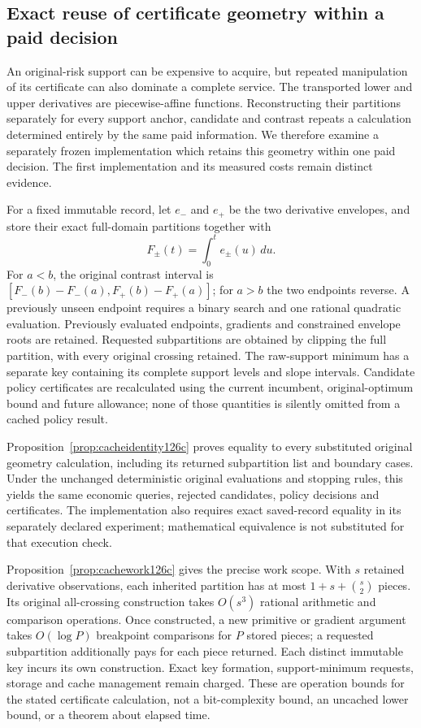 \subsection{Exact reuse of certificate geometry within a paid decision}
\label{sec:cachedgeometry126c}

An original-risk support can be expensive to acquire, but repeated manipulation
of its certificate can also dominate a complete service.  The transported
lower and upper derivatives are piecewise-affine functions.  Reconstructing
their partitions separately for every support anchor, candidate and contrast
repeats a calculation determined entirely by the same paid information.  We
therefore examine a separately frozen implementation which retains this
geometry within one paid decision.  The first implementation and its measured
costs remain distinct evidence.

For a fixed immutable record, let $e_-$ and $e_+$ be the two derivative
envelopes, and store their exact full-domain partitions together with
\[
 F_\pm(t)=\int_0^t e_\pm(u)\,du.
\]
For $a<b$, the original contrast interval is
$[F_-(b)-F_-(a),F_+(b)-F_+(a)]$; for $a>b$ the two endpoints reverse.
A previously unseen endpoint requires a binary search and one rational
quadratic evaluation.  Previously evaluated endpoints, gradients and
constrained envelope roots are retained.  Requested subpartitions are obtained
by clipping the full partition, with every original crossing retained.
The raw-support minimum has a separate key containing its complete support
levels and slope intervals.  Candidate policy certificates are recalculated
using the current incumbent, original-optimum bound and future allowance;
none of those quantities is silently omitted from a cached policy result.

Proposition~\ref{prop:cacheidentity126c} proves equality to every substituted
original geometry calculation, including its returned subpartition list and
boundary cases.  Under the unchanged deterministic original evaluations and
stopping rules, this yields the same economic queries, rejected candidates,
policy decisions and certificates.  The implementation also requires exact
saved-record equality in its separately declared experiment; mathematical
equivalence is not substituted for that execution check.

Proposition~\ref{prop:cachework126c} gives the precise work scope.  With $s$
retained derivative observations, each inherited partition has at most
$1+s+\binom{s}{2}$ pieces.  Its original all-crossing construction takes
$O(s^3)$ rational arithmetic and comparison operations.  Once constructed,
a new primitive or gradient argument takes $O(\log P)$ breakpoint
comparisons for $P$ stored pieces; a requested subpartition additionally
pays for each piece returned.  Each distinct immutable key incurs its own
construction.  Exact key formation, support-minimum requests, storage and
cache management remain charged.  These are operation bounds for the stated
certificate calculation, not a bit-complexity bound, an uncached lower bound,
or a theorem about elapsed time.

